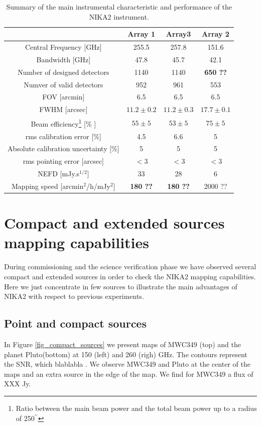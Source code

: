\documentclass[]{aa} %
\begin{document}
\begin{table}
\caption{Summary of the main instrumental characteristic and performance of the NIKA2 instrument. \label{sumperf}}
\begin{tabular}{|c|c|c|c|}
\hline
                          & Array 1 & Array3  & Array 2 \\
\hline
\hline
Central Frequency [GHz]   &     255.5    &    257.8     &   151.6      \\
Bandwidth         [GHz]   &     47.8     &     45.7     &   42.1       \\
\hline
Number of designed detectors       & 1140        &  1140       &  {\bf 650 ??}       \\
Numver of valid detectors          &  952      &   961      &   553      \\ 
\hline
FOV [arcmin]              &   6.5                &   6.5               &   6.5          \\
FWHM [arcsec]             &   $11.2 \pm 0.2$     &  $11.2 \pm 0.3$     &   $17.7 \pm 0.1$ \\      
Beam efficiency\footnote{Ratio between the main beam power and the total beam power up to a radius of 250$^{\prime \prime}$}   [\% ]   & $55 \pm 5$      & $53 \pm 5$        &     $75 \pm 5$ \\
\hline 
rms calibration error [\%]      &4.5  & 6.6  & 5 \\
Absolute calibration uncertainty [\%] &  5  &  5 &  5 \\
\hline
rms pointing error    [arcsec]    & $<3$ & $<3$&  $<3$ \\
\hline
NEFD [mJy.s$^{1/2}$]            & 33 & 28  & 6 \\
Mapping speed [arcmin$^2$/h/mJy$^2$] & {\bf 180 ??} & {\bf 180 ??} & 2000 ?? \\
\hline 
\end{tabular}
\end{table}

\section{Compact and extended sources mapping capabilities}
During commissioning and the science verification phase we have observed several compact and extended sources 
in order to check the NIKA2 mapping capabilities. Here we just concentrate in few sources to illustrate the main advantages of NIKA2 with respect to previous experiments.

\subsection{Point and compact sources} 
In Figure \ref{fig_compact_sources} we present maps of MWC349 (top) and the planet Pluto(bottom) at 150 (left) and 260 (righ) GHz.
The contours represent the SNR, which  blablabla .
We observe MWC349 and Pluto at the center of the maps and an extra source in the edge of the map. We find for MWC349 a flux of XXX Jy.
\end{document}
